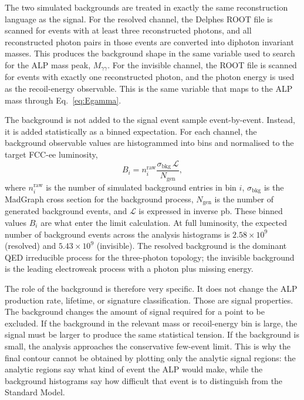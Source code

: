 \documentclass[12pt,a4paper]{article}
\newcommand{\Lint}{\mathcal{L}}
\begin{document}
The two simulated backgrounds are treated in exactly the same reconstruction
language as the signal. For the resolved channel, the Delphes ROOT file is
scanned for events with at least three reconstructed photons, and all
reconstructed photon pairs in those events are converted into diphoton
invariant masses. This produces the background shape in the same variable used
to search for the ALP mass peak, $M_{\gamma\gamma}$. For the invisible channel,
the ROOT file is scanned for events with exactly one reconstructed photon, and
the photon energy is used as the recoil-energy observable. This is the same
variable that maps to the ALP mass through Eq.~\eqref{eq:Egamma}.

The background is not added to the signal event sample event-by-event. Instead,
it is added statistically as a binned expectation. For each channel, the
background observable values are histogrammed into bins and normalised to the
target FCC-ee luminosity,
\begin{equation}
    B_i
    =
    n_i^\mathrm{raw}
    \frac{\sigma_\mathrm{bkg}\,\Lint}{N_\mathrm{gen}},
    \label{eq:bkg_norm}
\end{equation}
where $n_i^\mathrm{raw}$ is the number of simulated background entries in bin
$i$, $\sigma_\mathrm{bkg}$ is the MadGraph cross section for the background
process, $N_\mathrm{gen}$ is the number of generated background events, and
$\Lint$ is expressed in inverse pb. These binned values $B_i$ are what enter the
limit calculation. At full luminosity, the expected number of background events
across the analysis histograms is $2.58\times10^9$ (resolved) and
$5.43\times10^9$ (invisible). The resolved background is the dominant QED
irreducible process for the three-photon topology; the invisible background is
the leading electroweak process with a photon plus missing energy.

The role of the background is therefore very specific. It does not change the
ALP production rate, lifetime, or signature classification. Those are signal
properties. The background changes the amount of signal required for a point to
be excluded. If the background in the relevant mass or recoil-energy bin is
large, the signal must be larger to produce the same statistical tension. If
the background is small, the analysis approaches the conservative few-event
limit. This is why the final contour cannot be obtained by plotting only the
analytic signal regions: the analytic regions say what kind of event the ALP
would make, while the background histograms say how difficult that event is to
distinguish from the Standard Model.
\end{document}

